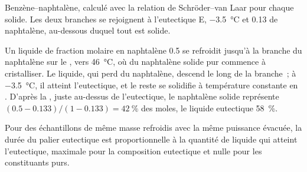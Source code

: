 \begin{omfigure}

{\small Benzène--naphtalène, calculé avec la relation de Schröder--van Laar
pour chaque solide. Les deux branches se rejoignent à l'eutectique E,
\qty{-3.5}{\degreeCelsius} et 0.13 de naphtalène, au-dessous duquel tout est solide.}
\end{omfigure}

\begin{example}\label{ex:b2:solid-liquid-diagrams:naphthalene}
Un liquide de fraction molaire en naphtalène 0.5 se refroidit jusqu'à la branche du naphtalène
sur le , vers \qty{46}{\degreeCelsius}, où du naphtalène solide pur
commence à cristalliser. Le liquide, qui perd du naphtalène, descend le long de la
branche~; à \qty{-3.5}{\degreeCelsius}, il atteint l'eutectique, et le reste
se solidifie à température constante en . D'après la ,
juste au-dessus de l'eutectique, le naphtalène solide représente $(0.5 - 0.133)/(1 - 0.133) =
42~\%$ des moles, le liquide eutectique 58~\%.
\end{example}

\begin{proposition}\label{prop:b2:solid-liquid-diagrams:plateau-length}
Pour des échantillons de même masse refroidis avec la même puissance évacuée, la
durée du palier eutectique est proportionnelle à la quantité de liquide qui
atteint l'eutectique, maximale pour la composition eutectique et nulle pour les
constituants purs.
\end{proposition}


